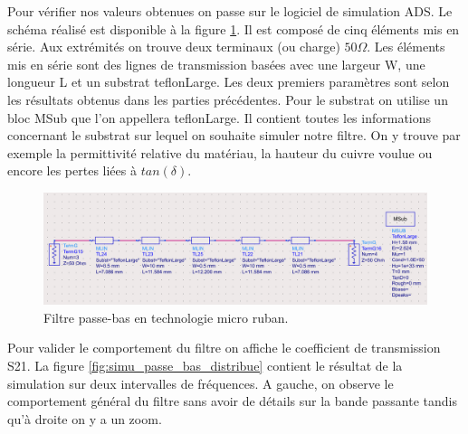 \documentclass[french]{article}
\begin{document}
Pour vérifier nos valeurs obtenues on passe sur le logiciel de simulation ADS. Le schéma réalisé est disponible à la figure \ref{fig:schema_distribue_passe_bas_ads}. Il est composé de cinq éléments mis en série. Aux extrémités on trouve deux terminaux (ou charge) $50\Omega$. Les éléments mis en série sont des lignes de transmission basées avec une largeur W, une longueur L et un substrat teflonLarge. Les deux premiers paramètres sont selon les résultats obtenus dans les parties précédentes. Pour le substrat on utilise un bloc MSub que l'on appellera teflonLarge. Il contient toutes les informations concernant le substrat sur lequel on souhaite simuler notre filtre. On y trouve par exemple la permittivité relative du matériau, la hauteur du cuivre voulue ou encore les pertes liées à $tan(\delta)$.

\begin{figure}[H]
	\centering
	\includegraphics[width=15cm]{photo/passe_bas_vic/schema_distribue_passe_bas_ads.png}
	\caption{Filtre passe-bas en technologie micro ruban.}
	\label{fig:schema_distribue_passe_bas_ads}
\end{figure}

Pour valider le comportement du filtre on affiche le coefficient de transmission S21. La figure \ref{fig:simu_passe_bas_distribue} contient le résultat de la simulation sur deux intervalles de fréquences. A gauche, on observe le comportement général du filtre sans avoir de détails sur la bande passante tandis qu'à droite on y a un zoom.
\end{document}
